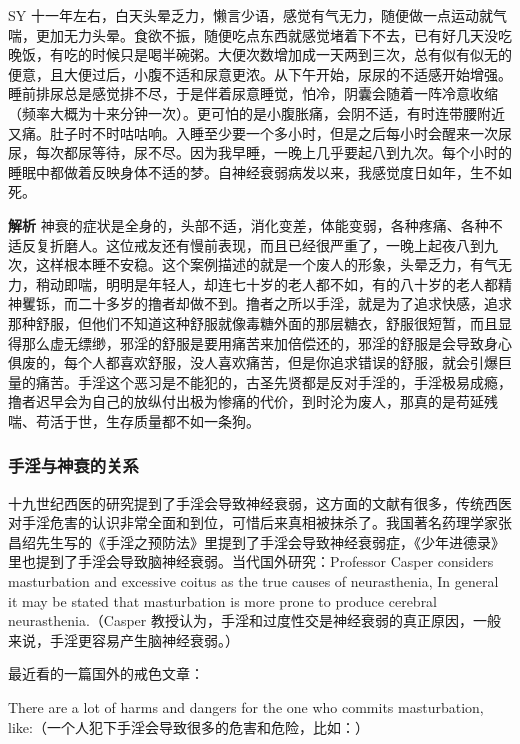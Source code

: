 \begin{case}[神经衰弱]
    SY 十一年左右，白天头晕乏力，懒言少语，感觉有气无力，随便做一点运动就气喘，更加无力头晕。食欲不振，随便吃点东西就感觉堵着下不去，已有好几天没吃晚饭，有吃的时候只是喝半碗粥。大便次数增加成一天两到三次，总有似有似无的便意，且大便过后，小腹不适和尿意更浓。从下午开始，尿尿的不适感开始增强。睡前排尿总是感觉排不尽，于是伴着尿意睡觉，怕冷，阴囊会随着一阵冷意收缩（频率大概为十来分钟一次）。更可怕的是小腹胀痛，会阴不适，有时连带腰附近又痛。肚子时不时咕咕响。入睡至少要一个多小时，但是之后每小时会醒来一次尿尿，每次都尿等待，尿不尽。因为我早睡，一晚上几乎要起八到九次。每个小时的睡眠中都做着反映身体不适的梦。自神经衰弱病发以来，我感觉度日如年，生不如死。

    \textbf{解析} 神衰的症状是全身的，头部不适，消化变差，体能变弱，各种疼痛、各种不适反复折磨人。这位戒友还有慢前表现，而且已经很严重了，一晚上起夜八到九次，这样根本睡不安稳。这个案例描述的就是一个废人的形象，头晕乏力，有气无力，稍动即喘，明明是年轻人，却连七十岁的老人都不如，有的八十岁的老人都精神矍铄，而二十多岁的撸者却做不到。撸者之所以手淫，就是为了追求快感，追求那种舒服，但他们不知道这种舒服就像毒糖外面的那层糖衣，舒服很短暂，而且显得那么虚无缥缈，邪淫的舒服是要用痛苦来加倍偿还的，邪淫的舒服是会导致身心俱废的，每个人都喜欢舒服，没人喜欢痛苦，但是你追求错误的舒服，就会引爆巨量的痛苦。手淫这个恶习是不能犯的，古圣先贤都是反对手淫的，手淫极易成瘾，撸者迟早会为自己的放纵付出极为惨痛的代价，到时沦为废人，那真的是苟延残喘、苟活于世，生存质量都不如一条狗。
\end{case}

\subsubsection{手淫与神衰的关系}

十九世纪西医的研究提到了手淫会导致神经衰弱，这方面的文献有很多，传统西医对手淫危害的认识非常全面和到位，可惜后来真相被抹杀了。我国著名药理学家张昌绍先生写的《手淫之预防法》里提到了手淫会导致神经衰弱症，《少年进德录》里也提到了手淫会导致脑神经衰弱。当代国外研究：Professor Casper considers masturbation and excessive coitus as the true causes of neurasthenia, In general it may be stated that masturbation is more prone to produce cerebral neurasthenia.（Casper 教授认为，手淫和过度性交是神经衰弱的真正原因，一般来说，手淫更容易产生脑神经衰弱。）

最近看的一篇国外的戒色文章：

There are a lot of harms and dangers for the one who commits masturbation, like:（一个人犯下手淫会导致很多的危害和危险，比如：）

